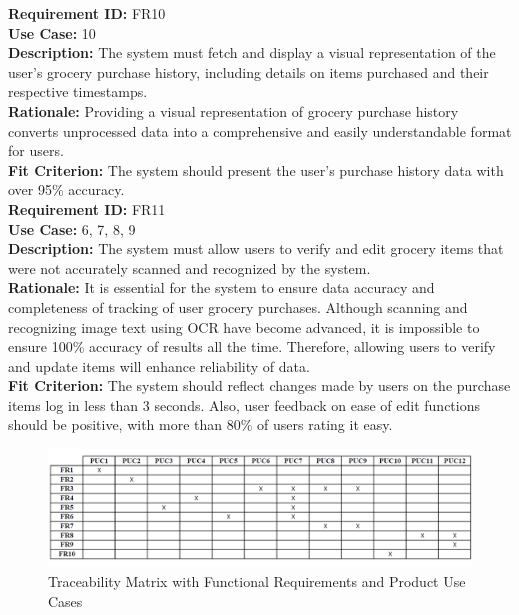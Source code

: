 \documentclass[12pt]{article}
\begin{document}
\medskip
\noindent \textbf{Requirement ID:} FR10\\
\textbf{Use Case:} 10\\
\textbf{Description:} The system must fetch and display a visual representation of the user's grocery purchase history, including details on items purchased and their respective timestamps.\\
\textbf{Rationale:} Providing a visual representation of grocery purchase history converts unprocessed data into a comprehensive and easily understandable format for users.\\
\textbf{Fit Criterion:} The system should present the user's purchase history data with over 95\% accuracy.\\

\medskip
\noindent \textbf{Requirement ID:} FR11\\
\textbf{Use Case:} 6, 7, 8, 9\\
\textbf{Description:} The system must allow users to verify and edit grocery items that were not accurately scanned and recognized by the system.\\
\textbf{Rationale:} It is essential for the system to ensure data accuracy and completeness of tracking of user grocery purchases. Although scanning and recognizing image text using OCR have become advanced, it is impossible to ensure 100\% accuracy of results all the time. Therefore, allowing users to verify and update items will enhance reliability of data.\\
\textbf{Fit Criterion:} The system should reflect changes made by users on the purchase items log in less than 3 seconds. Also, user feedback on ease of edit functions should be positive, with more than 80\% of users rating it easy.\\

\begin{figure}[H]
  \centering
  \includegraphics[width=\textwidth]{traceabilitymatrix}
  \caption{Traceability Matrix with Functional Requirements and Product Use Cases}
  \label{fig:traceabilitymatrix}
\end{figure}
\end{document}

